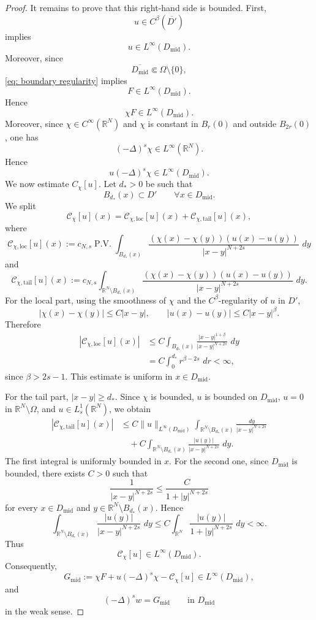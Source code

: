 \documentclass[11pt,a4paper]{article}
\newcommand{\dd}{\,d}
\newcommand{\PV}{\operatorname{P.V.}}
\begin{document}
\begin{proof}
It remains to prove that this right-hand side is bounded. First,
\[
u\in C^\beta(\overline{D'})
\]
implies
\[
u\in L^\infty(D_{\mathrm{mid}}).
\]
Moreover, since
\[
\overline{D_{\mathrm{mid}}}\Subset\Omega\setminus\{0\},
\]
\eqref{eq: boundary regularity} implies
\[
F\in L^\infty(D_{\mathrm{mid}}).
\]
Hence
\[
\chi F\in L^\infty(D_{\mathrm{mid}}).
\]
Moreover, since \(\chi\in C^\infty(\mathbb R^N)\) and \(\chi\) is constant in
\(B_r(0)\) and outside \(B_{2r}(0)\), one has
\[
(-\Delta)^s\chi\in L^\infty(\mathbb R^N).
\]
Hence
\[
u(-\Delta)^s\chi\in L^\infty(D_{\mathrm{mid}}).
\]
We now estimate \(C_\chi[u]\). Let \(d_*>0\) be such that
\[
B_{d_*}(x)\subset D'
\qquad
\forall x \in D_{\mathrm{mid}}.
\]
We split
\[
\mathcal C_\chi[u](x)
=
\mathcal C_{\chi,\mathrm{loc}}[u](x)
+
\mathcal C_{\chi,\mathrm{tail}}[u](x),
\]
where
\[
\mathcal C_{\chi,\mathrm{loc}}[u](x)
:=
c_{N,s}\PV\int_{B_{d_*}(x)}
\frac{(\chi(x)-\chi(y))(u(x)-u(y))}
{|x-y|^{N+2s}}
\,\dd y
\]
and
\[
\mathcal C_{\chi,\mathrm{tail}}[u](x)
:=
c_{N,s}\int_{\mathbb R^N\setminus B_{d_*}(x)}
\frac{(\chi(x)-\chi(y))(u(x)-u(y))}
{|x-y|^{N+2s}}
\,\dd y.
\]
For the local part, using the smoothness of \(\chi\) and the
\(C^\beta\)-regularity of \(u\) in \(D'\),
\[
|\chi(x)-\chi(y)|\le C|x-y|,
\qquad
|u(x)-u(y)|\le C|x-y|^\beta.
\]
Therefore
\[
\begin{aligned}
|\mathcal C_{\chi,\mathrm{loc}}[u](x)|
&\le
C\int_{B_{d_*}(x)}
\frac{|x-y|^{1+\beta}}
{|x-y|^{N+2s}}
\,\dd y\\
&=
C\int_0^{d_*} r^{\beta-2s}\,\dd r
<\infty,
\end{aligned}
\]
since \(\beta>2s-1\). This estimate is uniform in \(x\in D_{\mathrm{mid}}\).

For the tail part, \(|x-y|\ge d_*\). Since \(\chi\) is bounded, \(u\) is
bounded on \(D_{\mathrm{mid}}\), \(u=0\) in \(\mathbb R^N\setminus\Omega\),
and \(u\in L^1_s(\mathbb R^N)\), we obtain
\[
\begin{aligned}
|\mathcal C_{\chi,\mathrm{tail}}[u](x)|
&\le
C\|u\|_{L^\infty(D_{\mathrm{mid}})}
\int_{\mathbb R^N\setminus B_{d_*}(x)}
\frac{\dd y}{|x-y|^{N+2s}}\\
&\quad+
C\int_{\mathbb R^N\setminus B_{d_*}(x)}
\frac{|u(y)|}{|x-y|^{N+2s}}\,\dd y.
\end{aligned}
\]
The first integral is uniformly bounded in \(x\). For the second one, since
\(D_{\mathrm{mid}}\) is bounded, there exists \(C>0\) such that
\[
\frac1{|x-y|^{N+2s}}
\le
\frac{C}{1+|y|^{N+2s}}
\]
for every \(x\in D_{\mathrm{mid}}\) and
\(y\in\mathbb R^N\setminus B_{d_*}(x)\). Hence
\[
\int_{\mathbb R^N\setminus B_{d_*}(x)}
\frac{|u(y)|}{|x-y|^{N+2s}}\,\dd y
\le
C
\int_{\mathbb R^N}
\frac{|u(y)|}{1+|y|^{N+2s}}\,\dd y
<\infty.
\]
Thus
\[
\mathcal C_\chi[u]\in L^\infty(D_{\mathrm{mid}}).
\]
Consequently,
\[
G_{\mathrm{mid}}
:=
\chi F+u(-\Delta)^s\chi-\mathcal C_\chi[u]
\in L^\infty(D_{\mathrm{mid}}),
\]
and
\[
(-\Delta)^s w=G_{\mathrm{mid}}
\qquad\text{in }D_{\mathrm{mid}}
\]
in the weak sense.


\end{proof}
\end{document}
